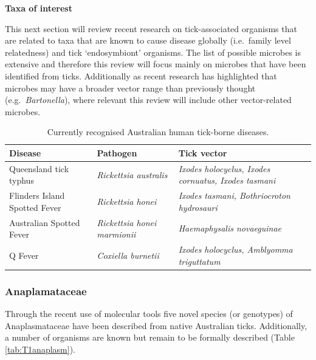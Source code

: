 \documentclass[a4paper, nobind]{templates/ociamthesis}
\begin{document}
\newpage

\textbf{Taxa of interest}

This next section will review recent research on tick-associated organisms that are related to taxa that are known to cause disease globally (i.e.~family level relatedness) and tick `endosymbiont' organisms.
The list of possible microbes is extensive and therefore this review will focus mainly on microbes that have been identified from ticks.
Additionally as recent research has highlighted that microbes may have a broader vector range than previously thought (e.g.~\emph{Bartonella}), where relevant this review will include other vector-related microbes.

\begin{table}

\caption[Australian human tick-borne diseases.]{\label{tab:T1ausTBD}Currently recognised Australian human tick-borne diseases.}
\centering
\fontsize{8.5}{10.5}\selectfont
\begin{tabular}[t]{l>{}l>{}l}
\toprule
Disease & Pathogen & Tick vector\\
\midrule
Queensland tick typhus & \em{Rickettsia australis} & \em{Ixodes holocyclus, Ixodes cornuatus, Ixodes tasmani}\\
Flinders Island Spotted Fever & \em{Rickettsia honei} & \em{Ixodes tasmani, Bothriocroton hydrosauri}\\
Australian Spotted Fever & \em{Rickettsia honei marmionii} & \em{Haemaphysalis novaeguinae}\\
Q Fever & \em{Coxiella burnetii} & \em{Ixodes holocyclus, Amblyomma triguttatum}\\
\bottomrule
\end{tabular}
\end{table}

\hypertarget{anaplamataceae}{%
\subsubsection{Anaplamataceae}\label{anaplamataceae}}

Through the recent use of molecular tools five novel species (or genotypes) of Anaplasmataceae have been described from native Australian ticks.
Additionally, a number of organisms are known but remain to be formally described (Table \ref{tab:T1anaplasm}).
\end{document}
